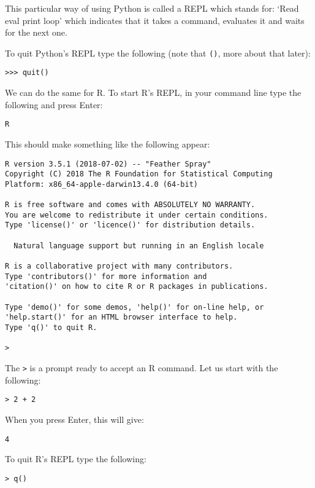This particular way of using Python is called a REPL which stands for: `Read
eval print loop' which indicates that it takes a command, evaluates it and waits
for the next one.

To quit Python's REPL type the following (note that \texttt{()},
more about that later):

\begin{verbatim}
>>> quit()
\end{verbatim}

We can do the same for R. To start R's REPL, in your command line type the
following and press Enter:

\begin{verbatim}
R
\end{verbatim}

This should make something like the following appear:

\begin{verbatim}
R version 3.5.1 (2018-07-02) -- "Feather Spray"
Copyright (C) 2018 The R Foundation for Statistical Computing
Platform: x86_64-apple-darwin13.4.0 (64-bit)

R is free software and comes with ABSOLUTELY NO WARRANTY.
You are welcome to redistribute it under certain conditions.
Type 'license()' or 'licence()' for distribution details.

  Natural language support but running in an English locale

R is a collaborative project with many contributors.
Type 'contributors()' for more information and
'citation()' on how to cite R or R packages in publications.

Type 'demo()' for some demos, 'help()' for on-line help, or
'help.start()' for an HTML browser interface to help.
Type 'q()' to quit R.

>
\end{verbatim}

The \texttt{>} is a prompt ready to accept an R command. Let
us start with the following:

\begin{verbatim}
> 2 + 2
\end{verbatim}

When you press Enter, this will give:

\begin{verbatim}
4
\end{verbatim}

To quit R's REPL type the following:

\begin{verbatim}
> q()
\end{verbatim}

